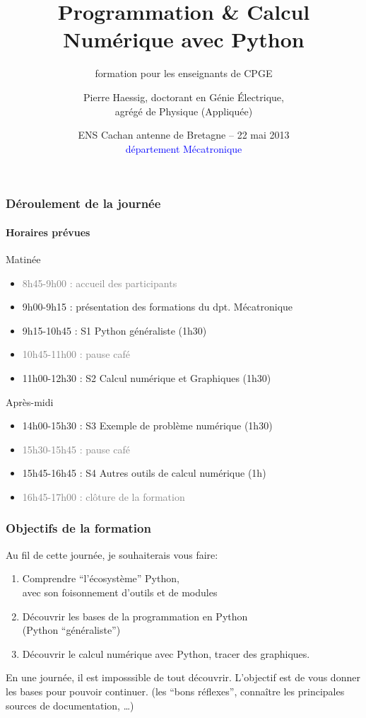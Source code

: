 \documentclass[]{beamer}
\title{Programmation \& Calcul Numérique avec Python}
\subtitle{formation pour les enseignants de CPGE}
\author{Pierre Haessig, doctorant en Génie Électrique, \\
        agrégé de Physique (Appliquée)}
\institute{EDF R\&D, ENS Cachan laboratoire SATIE}
\date{ENS Cachan antenne de Bretagne -- 22 mai 2013\\
      \textcolor{blue}{département Mécatronique}}
\begin{document}
  \begin{frame}
  \titlepage
  \end{frame}


  \begin{frame}
    \frametitle{Déroulement de la journée}
    \framesubtitle{Horaires prévues}

    Matinée
    \begin{itemize} \small
      \item \textcolor{gray}{8h45-9h00 : accueil des participants}
      \item 9h00-9h15 : présentation des formations du dpt. Mécatronique
      \item 9h15-10h45 :  S1 Python généraliste (1h30)
      \item \textcolor{gray}{10h45-11h00 : pause café}
      \item 11h00-12h30 :  S2 Calcul numérique et Graphiques (1h30)
    \end{itemize}

    \vspace{1em}

    Après-midi
    \begin{itemize} \small
      \item 14h00-15h30 :  S3 Exemple de problème numérique (1h30)
      \item \textcolor{gray}{15h30-15h45 : pause café}
      \item 15h45-16h45 :  S4 Autres outils de calcul numérique (1h)
      \item \textcolor{gray}{16h45-17h00 : clôture de la formation}
    \end{itemize}



  \end{frame}

  \begin{frame}
     \frametitle{Objectifs de la formation}

     Au fil de cette journée, je souhaiterais vous faire:
     \begin{enumerate}
      \item Comprendre ``l'écosystème'' Python, \\
            avec son foisonnement d'outils et de modules
      \item Découvrir les bases de la programmation en Python \\
            (Python ``généraliste'')
      \item Découvrir le calcul numérique avec Python, tracer des graphiques.
     \end{enumerate}

     \vspace{1em}
      {
     En une journée, il est imposssible de tout découvrir.
     L'objectif est de vous donner les bases pour pouvoir continuer.
     (les ``bons réflexes'',
     connaître les principales sources de documentation, \dots)
     }
  \end{frame}
\end{document}
